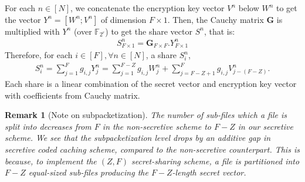 \documentclass[conference]{IEEEtran}
\newtheorem{rem}{Remark}
\begin{document}
 For each $n\in[N]$, we concatenate the encryption key vector $V^n$ below  $W^n$ to get the vector $Y^n=[W^n;V^n]$ of dimension $F\times 1$.
	Then, the Cauchy matrix $\mathbf{G}$ is multiplied with $Y^n$ (over $\mathbb{F}_{2^r}$) to get the share vector $S^n$, that is:
	\begin{align}
	S^n_{F\times1}=\mathbf{G}_{F\times F} . Y^n_{F\times 1}    
	\end{align}
Therefore, for each $i\in[F], \forall n\in [N]$, a share $S^n_i$,
\begin{align}\label{file_enc}
S^n_i=\sum_{j=1}^Fg_{i,j}Y^n_j=\sum_{j=1}^{F-Z}g_{i,j}W^n_j+ \sum_{j=F-Z+1}^Fg_{i,j}V^n_{j-(F-Z)}.
\end{align}
Each share is a linear combination of the secret vector and encryption key vector with coefficients from Cauchy matrix.
\begin{rem}[Note on subpacketization]
	The number of sub-files which a file is split into decreases from $F$ in the non-secretive scheme \cite{PDAmain} to $F-Z$ in our secretive scheme. We see that the subpacketization level drops by an additive gap in secretive coded caching scheme, compared to the non-secretive counterpart.  This is because, to implement the $(Z,F)$ secret-sharing scheme, a file is partitioned into $F-Z$ equal-sized sub-files producing the $F-Z$-length secret vector.
\end{rem}
\end{document}
